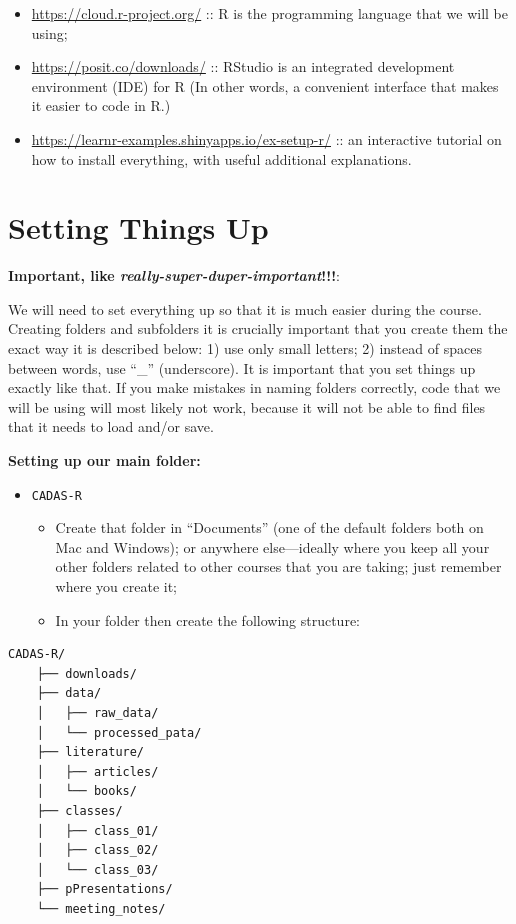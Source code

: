 \documentclass[
]{book}
\providecommand{\tightlist}{%
  \setlength{\itemsep}{0pt}\setlength{\parskip}{0pt}}
\begin{document}
\begin{itemize}
\tightlist
\item
  \url{https://cloud.r-project.org/} :: R is the programming language that we will be using;
\item
  \url{https://posit.co/downloads/} :: RStudio is an integrated development environment (IDE) for R (In other words, a convenient interface that makes it easier to code in R.)
\item
  \url{https://learnr-examples.shinyapps.io/ex-setup-r/} :: an interactive tutorial on how to install everything, with useful additional explanations.
\end{itemize}

\hypertarget{setting-things-up}{%
\section{Setting Things Up}\label{setting-things-up}}

\textbf{Important, like \emph{really-super-duper-important}!!!}:

We will need to set everything up so that it is much easier during the course. Creating folders and subfolders it is crucially important that you create them the exact way it is described below: 1) use only small letters; 2) instead of spaces between words, use ``\_'' (underscore). It is important that you set things up exactly like that. If you make mistakes in naming folders correctly, code that we will be using will most likely not work, because it will not be able to find files that it needs to load and/or save.

\textbf{Setting up our main folder:}

\begin{itemize}
\tightlist
\item
  \texttt{CADAS-R}

  \begin{itemize}
  \tightlist
  \item
    Create that folder in ``Documents'' (one of the default folders both on Mac and Windows); or anywhere else---ideally where you keep all your other folders related to other courses that you are taking; just remember where you create it;
  \item
    In your folder then create the following structure:
  \end{itemize}
\end{itemize}

\begin{verbatim}
CADAS-R/
    ├── downloads/
    ├── data/
    │   ├── raw_data/
    │   └── processed_pata/
    ├── literature/
    │   ├── articles/
    │   └── books/
    ├── classes/
    │   ├── class_01/
    │   ├── class_02/
    │   └── class_03/
    ├── pPresentations/
    └── meeting_notes/
\end{verbatim}
\end{document}
